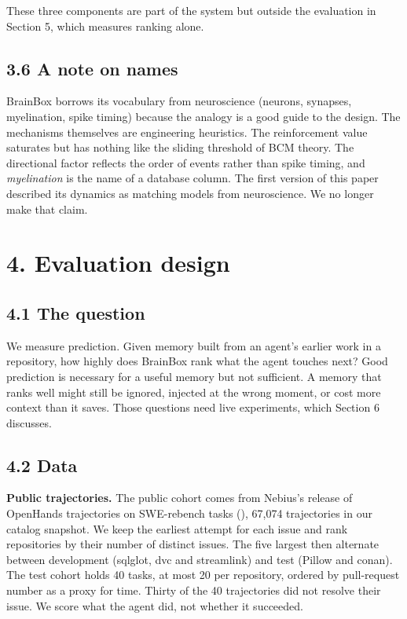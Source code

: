 \documentclass[
  american,
  11pt,
]{article}
\begin{document}
These three components are part of the system but outside the evaluation in Section 5, which measures ranking
alone.

\subsection{3.6 A note on names}\label{a-note-on-names}

BrainBox borrows its vocabulary from neuroscience (neurons, synapses, myelination, spike timing) because the
analogy is a good guide to the design. The mechanisms themselves are engineering heuristics. The reinforcement
value saturates but has nothing like the sliding threshold of BCM theory. The directional factor reflects the
order of events rather than spike timing, and \emph{myelination} is the name of a database column. The first
version of this paper described its dynamics as matching models from neuroscience. We no longer make that
claim.

\section{4. Evaluation design}\label{evaluation-design}

\subsection{4.1 The question}\label{the-question}

We measure prediction. Given memory built from an agent's earlier work in a repository, how highly does
BrainBox rank what the agent touches next? Good prediction is necessary for a useful memory but not
sufficient. A memory that ranks well might still be ignored, injected at the wrong moment, or cost more
context than it saves. Those questions need live experiments, which Section 6 discusses.

\subsection{4.2 Data}\label{data}

\textbf{Public trajectories.} The public cohort comes from Nebius's release of OpenHands trajectories on
SWE-rebench tasks (), 67,074 trajectories in our catalog
snapshot. We keep the earliest attempt for each issue and rank repositories by their number of distinct
issues. The five largest then alternate between development (sqlglot, dvc and streamlink) and test (Pillow and
conan). The test cohort holds 40 tasks, at most 20 per repository, ordered by pull-request number as a proxy
for time. Thirty of the 40 trajectories did not resolve their issue. We score what the agent did, not whether
it succeeded.
\end{document}
